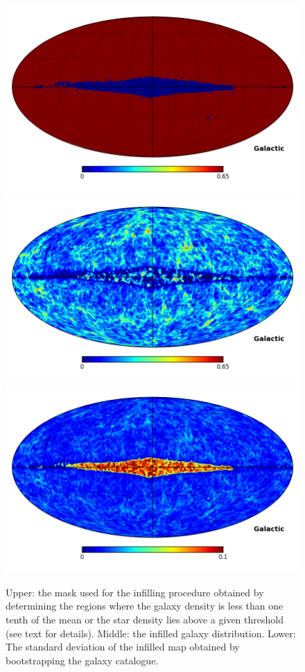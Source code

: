 \documentclass[useAMS,usenatbib]{mn2e}
\begin{document}
\begin{figure}
  \includegraphics[width=\columnwidth,clip,trim=0 1in 0 0]{prod_mask}
  \includegraphics[width=\columnwidth]{infilled_prod_mask}
  \includegraphics[width=\columnwidth]{sigma_prod_mask}
  \caption{Upper: the mask used for the infilling procedure obtained
    by determining the regions where the galaxy density is less than
    one tenth of the mean or the star density lies above a given
    threshold (see text for details).  Middle: the infilled galaxy
    distribution. Lower: The standard deviation of the infilled map
    obtained by bootstrapping the galaxy catalogue.}
  \label{fig:infilling}
\end{figure}
\end{document}
